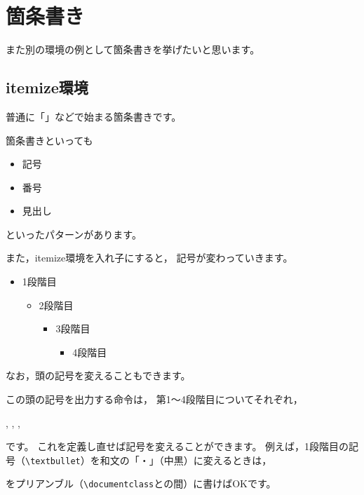 \section{箇条書き}
また別の環境の例として箇条書きを挙げたいと思います。


\subsection{itemize環境}
普通に「\textbullet」などで始まる箇条書きです。

\begin{IOTeX}
箇条書きといっても
\begin{itemize}
\item 記号
\item 番号
\item 見出し
\end{itemize}
といったパターンがあります。
\end{IOTeX}


また，itemize環境を入れ子にすると，
記号が変わっていきます。

\begin{IOTeX}
\begin{itemize}
\item 1段階目
  \begin{itemize}
  \item 2段階目
    \begin{itemize}
    \item 3段階目
      \begin{itemize}
      \item 4段階目
      \end{itemize}
    \end{itemize}
  \end{itemize}
\end{itemize}
\end{IOTeX}

なお，頭の記号を変えることもできます。

この頭の記号を出力する命令は，
第1～4段階目についてそれぞれ，
\begin{ITeX}
, , , 
\end{ITeX}
です。
これを定義し直せば記号を変えることができます。
例えば，1段階目の記号{\textbullet}（\verb|\textbullet|）を和文の「・」（中黒）に変えるときは，
\begin{ITeX}
\renewcommand{\labelitemi}{・}
\end{ITeX}
をプリアンブル（\verb|\documentclass|と\verb||の間）に書けばOKです。

